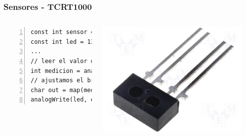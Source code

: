 \documentclass[compress]{beamer}
\begin{document}
\begin{frame}[fragile]
 \frametitle{Sensores - TCRT1000}
 \begin{columns}

 \begin{Verbatim}[formatcom=\color{red},fontseries=b, numbers=left,numbersep=3pt]
const int sensor = A0;
const int led = 13;
...
// leer el valor del sensor
int medicion = analogRead(sensor);
// ajustamos el brillo del led
char out = map(medicion, 0, 1023, 0, 255);
analogWrite(led, out);
\end{Verbatim}

\includegraphics[width=0.3\columnwidth]{./img/tccrt1000.jpg}

\begin{center}


\end{center}
\end{columns}
\end{frame}
\end{document}

